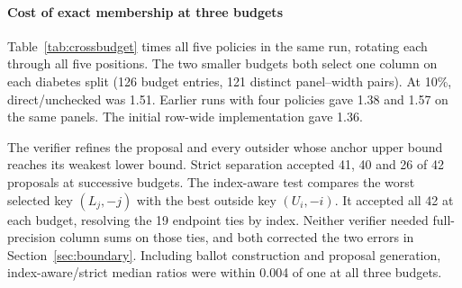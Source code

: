 \paragraph{Cost of exact membership at three budgets}
Table~\ref{tab:crossbudget} times all five policies in the same run, rotating each through all five positions. The two smaller budgets both select one column on each diabetes split (126 budget entries, 121 distinct panel--width pairs). At 10\%, direct/unchecked was 1.51. Earlier runs with four policies gave 1.38 and 1.57 on the same panels. The initial row-wide implementation gave 1.36.

The verifier refines the proposal and every outsider whose anchor upper bound reaches its weakest lower bound. Strict separation accepted 41, 40 and 26 of 42 proposals at successive budgets. The index-aware test compares the worst selected key $(L_j,-j)$ with the best outside key $(U_i,-i)$. It accepted all 42 at each budget, resolving the 19 endpoint ties by index. Neither verifier needed full-precision column sums on those ties, and both corrected the two errors in Section~\ref{sec:boundary}. Including ballot construction and proposal generation, index-aware/strict median ratios were within 0.004 of one at all three budgets.
